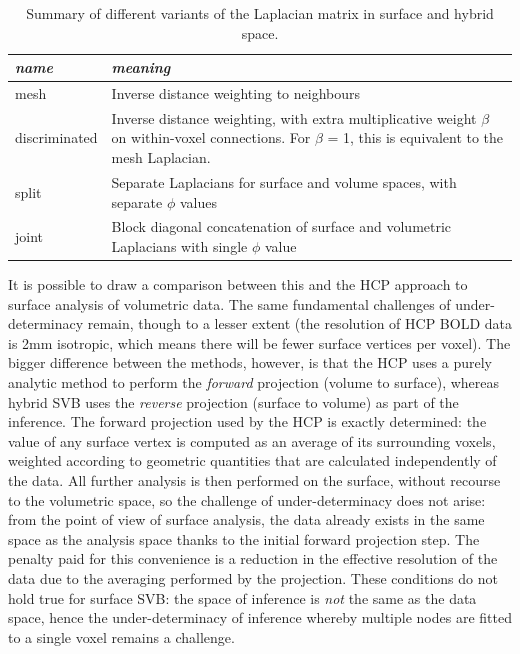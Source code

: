 \documentclass[12pt]{report}
\begin{document}
\begin{table}[h]
\centering
\def\arraystretch{1.5}
\begin{tabular}{p{3cm}|p{11cm}}
\textit{name} & \textit{meaning}                                                                                                                                             \\ \hline
mesh          & Inverse distance weighting to neighbours                                                                                                                     \\
discriminated & Inverse distance weighting, with extra multiplicative weight $\beta$ on within-voxel connections. For $\beta$ = 1, this is equivalent to the mesh Laplacian.
\\
split         & Separate Laplacians for surface and volume spaces, with separate $\phi$ values                                                                               \\
joint         & Block diagonal concatenation of surface and volumetric Laplacians with single $\phi$ value                                                                   
\end{tabular}
\caption{Summary of different variants of the Laplacian matrix in surface and hybrid space.}
\label{laplacian_table}
\end{table}

It is possible to draw a comparison between this and the HCP approach to surface analysis of volumetric data. The same fundamental challenges of under-determinacy remain, though to a lesser extent (the resolution of HCP BOLD data is 2mm isotropic, which means there will be fewer surface vertices per voxel). The bigger difference between the methods, however, is that the HCP uses a purely analytic method to perform the \textit{forward} projection (volume to surface), whereas hybrid SVB uses the \textit{reverse} projection (surface to volume) as part of the inference. The forward projection used by the HCP is exactly determined: the value of any surface vertex is computed as an average of its surrounding voxels, weighted according to geometric quantities that are calculated independently of the data. All further analysis is then performed on the surface, without recourse to the volumetric space, so the challenge of under-determinacy does not arise: from the point of view of surface analysis, the data already exists in the same space as the analysis space thanks to the initial forward projection step. The penalty paid for this convenience is a reduction in the effective resolution of the data due to the averaging performed by the projection. These conditions do not hold true for surface SVB: the space of inference is \textit{not} the same as the data space, hence the under-determinacy of inference whereby multiple nodes are fitted to a single voxel remains a challenge. 
\end{document}

